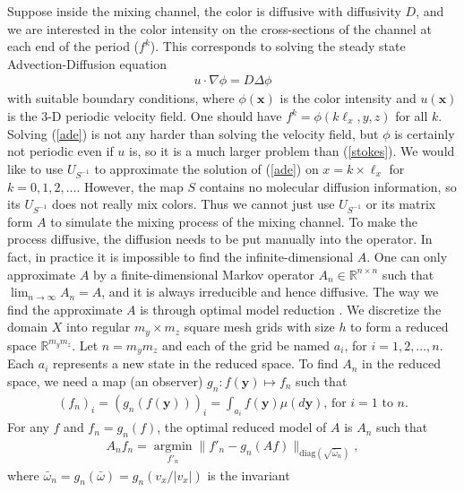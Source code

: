 Suppose inside the mixing channel, the color is diffusive with
diffusivity $D$, and we are interested in the color intensity on the
cross-sections of the channel at each end of the period ($f^k$). This
corresponds to solving the steady state Advection-Diffusion equation
 \begin{eqnarray}
 \label{ade}
        u \cdot \nabla \phi = D \Delta \phi
 \end{eqnarray}
with suitable boundary conditions, where 
$\phi(\mathbf{x})$ is the color intensity and $u(\mathbf{x})$ is the $3$-D
periodic velocity field. One should have $f^k = \phi(k\ell_x,y,z)$ for 
all $k$. Solving (\ref{ade}) is not any harder than
solving the velocity field, but $\phi$ is certainly not periodic even if
$u$ is, so it is a much larger problem than (\ref{stokes}). We
would like to use $U_{S^{-1}}$ to approximate the solution of
(\ref{ade}) on $x = k\times \ell_x$ for $k=0,1,2,\ldots$. However, the map
$S$ contains no molecular diffusion information, so its $U_{S^{-1}}$
does not really mix colors. Thus we cannot just use $U_{S^{-1}}$ or
its matrix form $A$ to simulate the mixing process of the mixing
channel. To make the process diffusive, the diffusion needs to be put
manually into the operator. In fact, in practice it is impossible to
find the infinite-dimensional $A$. One can only approximate $A$ by a
finite-dimensional Markov operator $A_n\in \mathbb{R}^{n\times n}$
such that $\lim_{n \rightarrow \infty}A_n =A$, and it is always
irreducible and hence diffusive. The way we find the approximate $A$
is through optimal model reduction \cite{Beck2007, Froyland2001,
Froyland1999}. We discretize the domain $X$ into regular $m_y \times
m_z$ square mesh grids with size $h$ to form a reduced space
$\mathbb{R}^{m_y m_z}$. Let $n=m_y m_z$ and each of the grid be named
$a_i$, for $i=1,2,\ldots,n$. Each $a_i$ represents a new state in the
reduced space. To find $A_n$ in the reduced space, we need a map (an
observer) $g_n: f(\mathbf{y}) \mapsto f_n $ such that
\begin{eqnarray}
  (f_n)_i = (g_n(f(\mathbf{y})))_i = \int_{a_i} f(\mathbf{y}) \mu(d\mathbf{y})  \mbox{, for }i = 1 \mbox{ to } n.
\end{eqnarray}
For any $f$ and $f_n = g_n(f)$, the optimal reduced model of $A$ is
$A_n$ such that
\begin{eqnarray}
\label{objfunction}
  A_n f_n = \operatorname*{argmin}_{{f'_n}} \| {f'_n} -g_n(Af) \|_{\text{diag}(\sqrt{\bar{\omega}_n})},
\end{eqnarray}
where  $\bar{\omega}_n =g_n(\bar{\omega})= g_n(v_x/|v_x|)$ is the invariant
